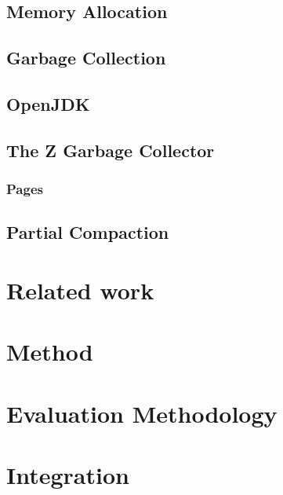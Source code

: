 \documentclass[a4paper,12pt]{article}
\begin{document}
\subsection{Memory Allocation}
\label{sec:memory_allocation}


\newpage
\subsection{Garbage Collection}
\label{sec:gc}


\subsection{OpenJDK}
\label{sec:openjdk}


\subsection{The Z Garbage Collector}
\label{sec:zgc}


\subsubsection{Pages}
\label{sec:zpage}


\subsection{Partial Compaction}
\label{sec:partial-compaction}


\newpage
\section{Related work}


\newpage
\section{Method}
\label{sec:method}


\newpage
\section{Evaluation Methodology}
\label{sec:evaluation}


\newpage
\section{Integration}
\label{sec:integration}

\end{document}
